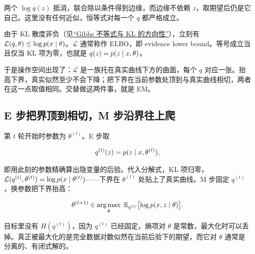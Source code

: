 两个 \(\log q(z)\) 抵消，联合除以条件得到边缘，而边缘不依赖 \(z\)，取期望后仍是它自己。这里没有任何近似，恒等式对每一个 \(q\) 都严格成立。

由于 KL 散度非负（见\hyperref[sec:07-Information-Theory/03-Divergences/02]{``Gibbs 不等式与 KL 的方向性''}），立刻有 \(\mathcal L(q,\theta)\le\log p(x\mid\theta)\)。\(\mathcal L\) 通常称作 ELBO，即 evidence lower bound。等号成立当且仅当 KL 项为零，也就是 \(q(z)=p(z\mid x,\theta)\)。

于是操作空间出现了：\(\mathcal L\) 是一族托在真实曲线下方的曲面，每个 \(q\) 对应一张。抬高下界，真实似然至少不会下降；把下界在当前参数处顶到与真实曲线相切，两者在这一点取值相同。交替做这两件事，就是 EM。

\subsection{E 步把界顶到相切，M 步沿界往上爬}

第 \(t\) 轮开始时参数为 \(\theta^{(t)}\)。E 步取

\[
q^{(t)}(z)=p(z\mid x,\theta^{(t)}),
\]

即用此刻的参数精确算出隐变量的后验。代入分解式，KL 项归零，\(\mathcal L(q^{(t)},\theta^{(t)})=\log p(x\mid\theta^{(t)})\)——下界在 \(\theta^{(t)}\) 处贴上了真实曲线。M 步固定 \(q^{(t)}\)，换参数把下界抬高：

\[
\theta^{(t+1)}\in\operatorname*{arg\,max}_\theta\;\mathbb{E}_{q^{(t)}}\bigl[\log p(x,z\mid\theta)\bigr].
\]

目标里没有 \(H(q^{(t)})\)，因为 \(q^{(t)}\) 已经固定，熵项对 \(\theta\) 是常数，最大化时可以丢掉。真正被最大化的是完全数据对数似然在当前后验下的期望，而它对 \(\theta\) 通常是分离的、有闭式解的。

